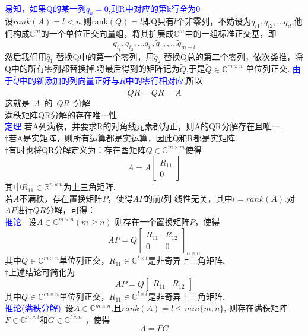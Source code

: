\documentclass[12pt,a4paper]{article}
\begin{document}
\textcolor{blue}{易知，如果Q的某一列$q_k=0$,则R中对应的第k行全为0}\\
设$rank(A)=l<n$,则rank$(Q)=l$即Q只有$l$个非零列，不妨设为$ q_{i1},q_{i2},...q_{il} $,他们构成$ \mathbb{C}^m $的一个单位正交向量组，将其扩展成$ \mathbb{C}^m $中的一组标准正交基，即
\[
q_{i_1},q_{i_2},...q_{i_l},\tilde{q}_1,,...\tilde{q}_{m-l}
\]
然后我们用$ \tilde{q_1} $ 替换Q中的第一个零列，用$ \tilde{q}_2 $	替换Q总的第二个零列，依次类推，将Q中的所有零列都替换掉.将最后得到的矩阵记为$\tilde{Q}$,于是$\tilde{Q}\in\mathbb{C}^{m\times n}$ 单位列正交. \textcolor{blue}{由于$\tilde{Q}$中的新添加的列向量正好与$R$中的零行相对应},所以
\[
\tilde{Q}R=QR=A
\]
这就是~$A$~的~$QR$~分解\\


\noindent 满秩矩阵QR分解的存在唯一性\\

\textcolor{blue}{定理} 若A列满秩，并要求R的对角线元素都为正，则A的QR分解存在且唯一.\\

$\dagger$若A是实矩阵，则所有运算都是实运算，因此Q和R都是实矩阵.\\

$\dagger$有时也将QR分解定义为：存在酉矩阵$Q\in\mathbb{C}^{m\times m}$使得
\[
A = A\begin{bmatrix}R_{11}\\0\end{bmatrix}
\]
其中$R_{11}\in\mathbb{R}^{n\times n}$为上三角矩阵.\\

若$A$不满秩，存在置换矩阵$P$，使得$AP$的前$l$列
线性无关，其中$l=rank(A)$.对$AP$进行$QR$分解，可得：\\
\textcolor{blue}{推论} ~设$A\in\mathbb{C}^{m\times n}(m\geq n)$ 则存在一个置换矩阵$P$，使得
\[
AP=Q\begin{bmatrix}R_{11}&R_{12}\\0&0\end{bmatrix}_{n\times n}
\]
其中$Q\in\mathbb{C}^{m\times n}$单位列正交，$R_{11}\in\mathbb{C}^{l\times l}$是非奇异上三角矩阵.\\
$\dagger$上述结论可简化为
\[
AP=Q\begin{bmatrix}R_{11}&R_{12}\end{bmatrix}
\]
其中$Q\in\mathbb{C}^{m\times n}$单位列正交，$R_{11}\in\mathbb{C}^{l\times l}$是非奇异上三角矩阵.\\
\textcolor{blue}{推论(满秩分解)}~设$A\in\mathbb{C}^{m\times n}$,且$rank(A)=l\le min\{m,n\}$, 则存在满秩矩阵$F\in\mathbb{C}^{m\times l}$和$G\in\mathbb{C}^{l\times n}$ ，使得
\[
A=FG
\]
\end{document}
